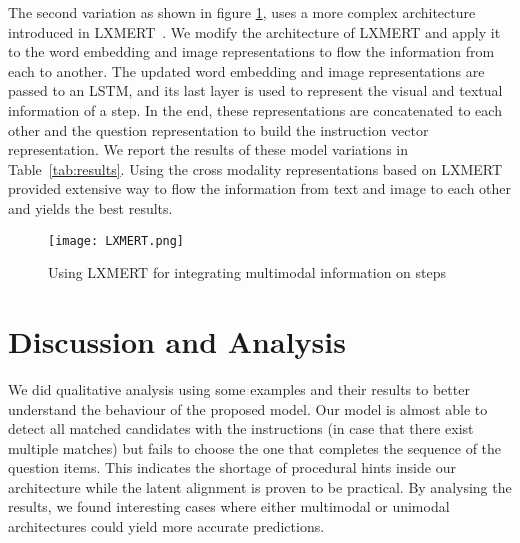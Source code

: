 \documentclass[11pt,a4paper]{article}
\begin{document}
The second variation as shown in figure \ref{fig:lxmert}, uses a more complex architecture introduced in LXMERT~\cite{tan-bansal-2019-lxmert}. We modify the architecture of LXMERT and apply it to the word embedding and image representations to flow the information from each to another. The updated word embedding and image representations are passed to an LSTM, and its last layer is used to represent the visual and textual information of a step. In the end, these representations are concatenated to each other and the question representation to build the instruction vector representation.
We report the results of these model variations in Table~\ref{tab:results}. Using the cross modality representations based on LXMERT provided extensive way to flow the information from text and image to each other and yields the best results.
\begin{figure}[h]
    \centering
    \texttt{[image: LXMERT.png]}
    \caption{Using LXMERT for integrating multimodal information on steps}
    \label{fig:lxmert}
\end{figure}


\section{Discussion and Analysis}
\label{sec:discussion}
We did qualitative analysis using some examples and their results to better understand the behaviour of the proposed model.
Our model is almost able to detect all matched candidates with the instructions (in case that there exist multiple matches) but fails to choose the one that completes the sequence of the question items. 
This indicates the shortage of procedural hints inside our architecture while the latent alignment is proven to be practical.
By analysing the results, we found interesting cases where either multimodal or unimodal architectures could yield more accurate predictions.
\end{document}

